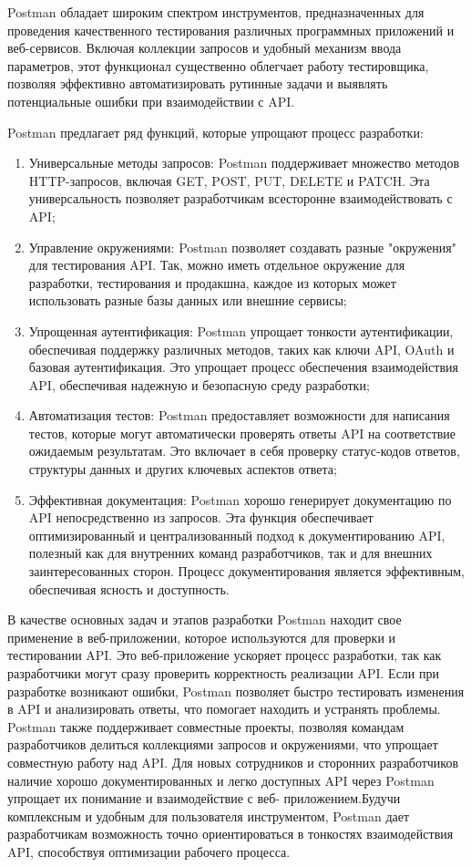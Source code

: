 \documentclass[master, och, diploma]{SCWorks}
\begin{document}
Postman обладает широким спектром инструментов, предназначенных для проведения качественного тестирования различных программных приложений и веб-сервисов. Включая коллекции запросов и удобный механизм ввода параметров, этот функционал существенно облегчает работу тестировщика, позволяя эффективно автоматизировать рутинные задачи и выявлять потенциальные ошибки при взаимодействии с API\cite{Marinchuk_2020}.

Postman предлагает ряд функций, которые упрощают процесс разработки:
\begin{enumerate}
    \item Универсальные методы запросов: Postman поддерживает множество методов HTTP-запросов, включая GET, POST, PUT, DELETE и PATCH. Эта универсальность позволяет разработчикам всесторонне взаимодействовать с API;
    \item Управление окружениями: Postman позволяет создавать разные "окружения" для тестирования API. Так, можно иметь отдельное окружение для разработки, тестирования и продакшна, каждое из которых может использовать разные базы данных или внешние сервисы;
    \item Упрощенная аутентификация: Postman упрощает тонкости аутентификации, обеспечивая поддержку различных методов, таких как ключи API, OAuth и базовая аутентификация. Это упрощает процесс обеспечения взаимодействия API, обеспечивая надежную и безопасную среду разработки;
    \item Автоматизация тестов: Postman предоставляет возможности для написания тестов, которые могут автоматически проверять ответы API на соответствие ожидаемым результатам. Это включает в себя проверку статус-кодов ответов, структуры данных и других ключевых аспектов ответа;
    \item Эффективная документация: Postman хорошо генерирует документацию по API непосредственно из запросов. Эта функция обеспечивает оптимизированный и централизованный подход к документированию API, полезный как для внутренних команд разработчиков, так и для внешних заинтересованных сторон. Процесс документирования является эффективным, обеспечивая ясность и доступность\cite{postman_introduction}.
\end{enumerate}

В качестве основных задач и этапов разработки Postman находит свое применение в веб-приложении, которое используются для проверки и тестировании API. Это веб-приложение ускоряет процесс разработки, так как разработчики могут сразу проверить корректность реализации API. Если при разработке возникают ошибки, Postman позволяет быстро тестировать изменения в API и анализировать ответы, что  помогает находить и устранять проблемы. Postman также поддерживает совместные проекты, позволяя командам разработчиков делиться коллекциями запросов и окружениями, что упрощает совместную работу над API. Для новых сотрудников и сторонних разработчиков наличие хорошо документированных и легко доступных API через  Postman упрощает их понимание и взаимодействие с веб- приложением.Будучи комплексным и удобным для пользователя инструментом, Postman дает разработчикам возможность точно ориентироваться в тонкостях взаимодействия API, способствуя оптимизации рабочего процесса\cite{postman_introduction}.
\end{document}
